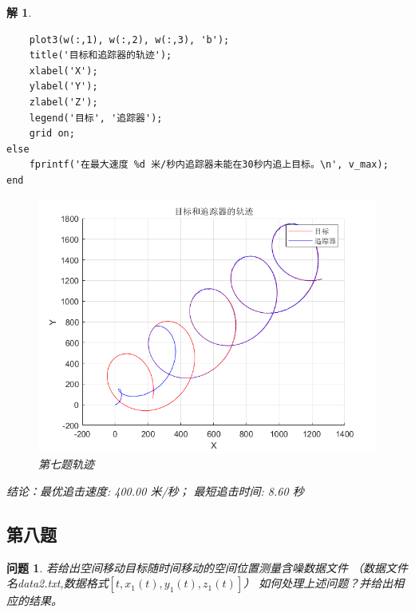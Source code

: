 \documentclass[a4paper, 12pt]{ctexart}
\newtheorem*{theorem}{解}
\newtheorem*{example}{问题}
\begin{document}
\begin{theorem}
\begin{lstlisting}
    plot3(w(:,1), w(:,2), w(:,3), 'b');
    title('目标和追踪器的轨迹');
    xlabel('X');
    ylabel('Y');
    zlabel('Z');
    legend('目标', '追踪器');
    grid on;
else
    fprintf('在最大速度 %d 米/秒内追踪器未能在30秒内追上目标。\n', v_max);
end    
\end{lstlisting}
\begin{figure}[h]
    \centering
    \includegraphics[width=5in]{pic/t7.png}
    \caption*{第七题轨迹}
\end{figure}
结论：最优追击速度: 400.00 米/秒；
最短追击时间: 8.60 秒
\end{theorem}
\subsection{第八题}

\begin{example}
    若给出空间移动目标随时间移动的空间位置测量含噪数据文件
    （数据文件名data2.txt,数据格式$[t,x_1(t),y_1(t),z_1(t)]$）
    如何处理上述问题？并给出相应的结果。  
\end{example}
\end{document}
